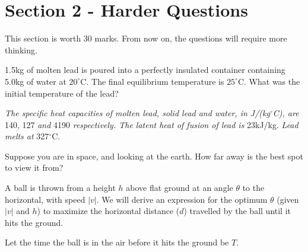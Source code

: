 \documentclass{exam}
\begin{document}
\newpage
\section*{Section 2 - Harder Questions}
This section is worth 30 marks. From now on, the questions will require more thinking.
\vspace{20pt}

\begin{questions}
    \setcounter{question}{6}

    \question[4]
    1.5kg of molten lead is poured into a perfectly insulated container containing 5.0kg of water at $20^\circ$C.
    The final equilibrium temperature is $25^\circ$C.
    What was the initial temperature of the lead?

    \textit{The specific heat capacities of molten lead, solid lead and water, in J/(kg$^\circ$C), are} 140, 127 \textit{and} 4190 \textit{respectively.
    The latent heat of fusion of lead is} 23kJ/kg.
    \textit{Lead melts at} 327$^\circ$C.


    \question[5]
    Suppose you are in space, and looking at the earth. How far away is the best spot to view it from?

    \question
    A ball is thrown from a height $h$ above flat ground at an angle $\theta$ to the horizontal, with speed $|v|$.
    We will derive an expression for the optimum $\theta$ (given $|v|$ and $h$) to maximize the horizontal distance ($d$) travelled by the ball until it hits the ground.

    Let the time the ball is in the air before it hits the ground be $T$.
\end{questions}
\end{document}
